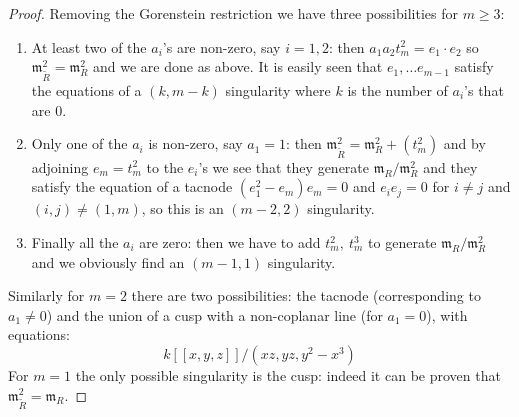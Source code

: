 \documentclass[11pt]{amsart}
\theoremstyle{plain}
\theoremstyle{definition}
\begin{document}
\begin{proof}
Removing the Gorenstein restriction we have three possibilities for $m\geq 3$:
\begin{enumerate}
\item At least two of the $a_i$'s are non-zero, say $i=1,2$: then $a_1a_2t_m^2=e_1\cdot e_2$ so $\mathfrak{m}^2_{\widetilde{R}}=\mathfrak{m}^2_{R}$ and we are done as above. It is easily seen that  $e_1,\dots e_{m-1}$ satisfy the equations of a $(k,m-k)$ singularity where $k$ is the number of $a_i$'s that are $0$.
\item Only one of the $a_i$ is non-zero, say $a_1=1$: then $\mathfrak{m}^2_{\widetilde{R}}=\mathfrak{m}^2_{R}+(t_m^2)$ and by adjoining $e_m=t_m^2$ to the $e_i$'s we see that they generate $\mathfrak{m}_R/\mathfrak{m}^2_R$ and they satisfy the equation of a tacnode $(e_1^2-e_m)e_m=0$ and $e_ie_j=0$ for $i\neq j$ and $(i,j)\neq(1,m)$, so this is an $(m-2,2)$ singularity.
\item Finally all the $a_i$ are zero: then we have to add $t_m^2,\ t_m^3$ to generate $\mathfrak{m}_R/\mathfrak{m}^2_R$ and we obviously find an $(m-1,1)$ singularity.
\end{enumerate}
\noindent Similarly for $m=2$ there are two possibilities: the tacnode (corresponding to $a_1\neq 0$) and the union of a cusp with a non-coplanar line (for $a_1=0$), with equations:
\[ k[[x,y,z]]/(xz,yz,y^2-x^3)\]
\noindent For $m= 1$ the only possible singularity is the cusp: indeed it can be proven that $\mathfrak{m}^2_{\widetilde{R}}=\mathfrak{m}_{R}$. 
\end{proof}
\end{document}
